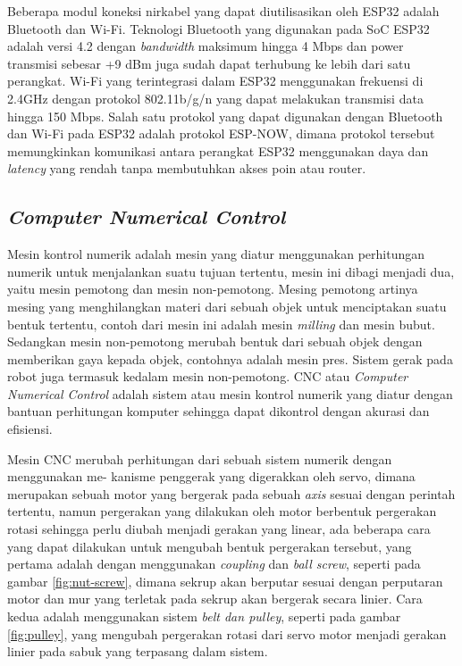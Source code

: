 Beberapa modul koneksi nirkabel yang dapat diutilisasikan oleh ESP32 adalah Bluetooth dan Wi-Fi. Teknologi Bluetooth yang digunakan pada SoC ESP32 adalah versi 4.2 dengan \textit{bandwidth} maksimum hingga 4 Mbps dan power transmisi sebesar +9 dBm juga sudah dapat terhubung ke lebih dari satu perangkat. Wi-Fi yang terintegrasi dalam ESP32 menggunakan frekuensi di 2.4GHz dengan protokol 802.11b/g/n yang dapat melakukan transmisi data hingga 150 Mbps. Salah satu protokol yang dapat digunakan dengan Bluetooth dan Wi-Fi pada ESP32 adalah protokol ESP-NOW, dimana protokol tersebut memungkinkan komunikasi antara perangkat ESP32 menggunakan daya dan \textit{latency} yang rendah tanpa membutuhkan akses poin atau router. \parencite{esp32-datasheer}

\subsection{\textit{Computer Numerical Control}}
Mesin kontrol numerik adalah mesin yang diatur menggunakan perhitungan numerik untuk menjalankan suatu tujuan tertentu, mesin ini dibagi menjadi dua, yaitu mesin pemotong dan mesin non-pemotong. Mesing pemotong artinya mesing yang menghilangkan materi dari sebuah objek untuk menciptakan suatu bentuk tertentu, contoh dari mesin ini adalah mesin \textit{milling} dan mesin bubut. Sedangkan mesin non-pemotong merubah bentuk dari sebuah objek dengan memberikan gaya kepada objek, contohnya adalah mesin pres. Sistem gerak pada robot juga termasuk kedalam mesin non-pemotong. CNC atau \textit{Computer Numerical Control} adalah sistem atau mesin kontrol numerik yang diatur dengan bantuan perhitungan komputer sehingga dapat dikontrol dengan akurasi dan efisiensi. 

Mesin CNC merubah perhitungan dari sebuah sistem numerik dengan menggunakan me- kanisme penggerak yang digerakkan oleh servo, dimana merupakan sebuah motor yang bergerak pada sebuah \textit{axis} sesuai dengan perintah tertentu, namun pergerakan yang dilakukan oleh motor berbentuk pergerakan rotasi sehingga perlu diubah menjadi gerakan yang linear, ada beberapa cara yang dapat dilakukan untuk mengubah bentuk pergerakan tersebut, yang pertama adalah dengan menggunakan \textit{coupling} dan \textit{ball screw}, seperti pada gambar \ref{fig:nut-screw}, dimana sekrup akan berputar sesuai dengan perputaran motor dan mur yang terletak pada sekrup akan bergerak secara linier. Cara kedua adalah menggunakan sistem \textit{belt dan pulley}, seperti pada gambar \ref{fig:pulley}, yang mengubah pergerakan rotasi dari servo motor menjadi gerakan linier pada sabuk yang terpasang dalam sistem. 

